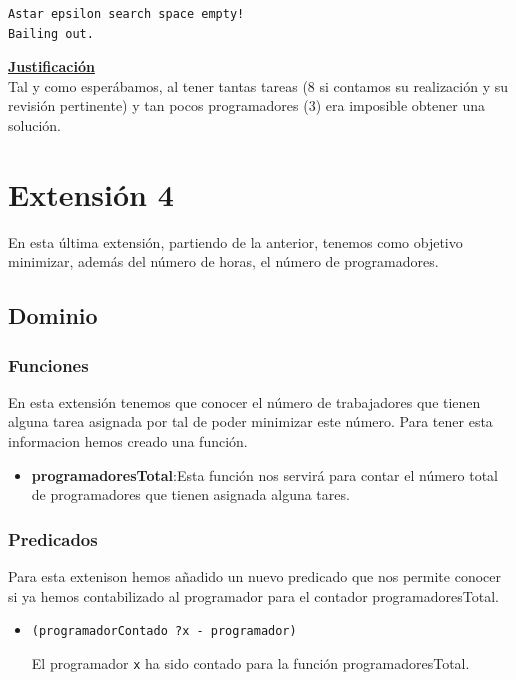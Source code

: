 \documentclass[11pt]{article}
\begin{document}
\begin{verbatim}
Astar epsilon search space empty!
Bailing out.
\end{verbatim}
\noindent \underline{\textbf{Justificación}}\\

Tal y como esperábamos, al tener tantas tareas (8 si contamos su realización y su revisión pertinente) y tan pocos programadores (3) era imposible obtener una solución. 
\medskip

\section{Extensión 4}

En esta última extensión, partiendo de la anterior, tenemos como objetivo minimizar, además del número de horas, el número de programadores. 
\subsection{Dominio}
\subsubsection{Funciones}
En esta extensión tenemos que conocer el número de trabajadores que tienen alguna tarea asignada por tal de poder minimizar este número. Para tener esta informacion hemos creado una función.
\begin{itemize}
	\item \textbf{programadoresTotal}:Esta función nos servirá para contar el número total de programadores que tienen asignada alguna tares.  
\end{itemize}
\subsubsection{Predicados}
Para esta extenison hemos añadido un nuevo predicado que nos permite conocer si ya hemos contabilizado al programador para el contador programadoresTotal.
\begin{itemize}
  \item \verb|(programadorContado ?x - programador)|
  
  El programador \texttt{x} ha sido contado para la función programadoresTotal.
\end{itemize}
\end{document}
